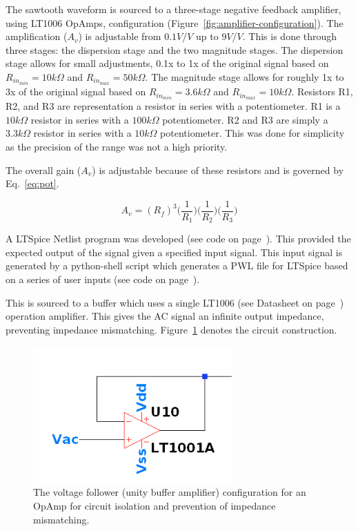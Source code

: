 \documentclass[12pt,journal]{IEEEtran}
\begin{document}
The sawtooth waveform is sourced to a three-stage negative feedback amplifier, using LT1006 OpAmps, configuration (Figure~\ref{fig:amplifier-configuration}). The amplification ($A_v$) is adjustable from $0.1 V/V$ up to $9 V/V$. This is done through three stages: the dispersion stage and the two magnitude stages. The dispersion stage allows for small adjustments, 0.1x to 1x of the original signal based on $R_{in_{min}} = 10k\Omega$ and $R_{in_{max}} = 50k\Omega$. The magnitude stage allows for roughly 1x to 3x of the original signal based on  $R_{in_{min}} = 3.6k\Omega$ and $R_{in_{max}} = 10k\Omega$. Resistors R1, R2, and R3 are representation a resistor in series with a potentiometer. R1 is a $10k\Omega$ resistor in series with a $100k\Omega$ potentiometer. R2 and R3 are simply a $3.3k\Omega$ resistor in series with a $10k\Omega$ potentiometer. This was done for simplicity as the precision of the range was not a high priority. 

The overall gain ($A_v$) is adjustable because of these resistors and is governed by Eq.~\ref{eq:pot}.

\begin{equation}
A_v = (R_f)^3\Big(\frac{1}{R_1}\Big)\Big(\frac{1}{R_2}\Big)\Big(\frac{1}{R_3}\Big)
\label{eq:pot}
\end{equation}

A LTSpice Netlist program was developed (see code on page~\pageref{code:ltspice-driver}). This provided the expected output of the signal given a specified input signal. This input signal is generated by a python-shell script which generates a PWL file for LTSpice based on a series of user inputs (see code on page~\pageref{code:pwl-ltspice-python}).

This is sourced to a buffer which uses a single LT1006 (see Datasheet on page~\pageref{datasheet:lt1006}) operation amplifier. This gives the AC signal an infinite output impedance, preventing impedance mismatching. Figure~\ref{fig:buffer} denotes the circuit construction.

\begin{figure}[h!]
  \centering
	\includegraphics[width=3in]{./ltspice/unity-buffer-ltspice.png}
	\caption[Cavity Mounts]{The voltage follower (unity buffer amplifier) configuration for an OpAmp for circuit isolation and prevention of impedance mismatching.}
	\label{fig:buffer}
\end{figure}  
\end{document}
